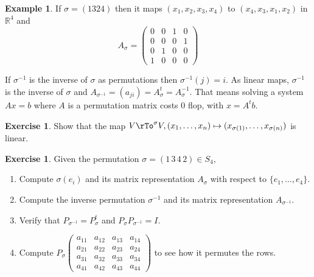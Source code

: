 \documentclass[12pt]{amsart}
\theoremstyle{definition}
\newtheorem{example}[theorem]{Example}
\newtheorem{exercise}[theorem]{Exercise}
\begin{document}
\begin{example} If $\sigma = (1 3 2 4)$ then it maps $(x_1, x_2, x_3, x_4)$ to $(x_4, x_3, x_1, x_2)$ in $\mathbb{R}^4$ and
$$A_{\sigma} = \left(\begin{array}{cccc} 0 & 0 & 1 & 0 \\ 0 & 0 & 0 & 1 \\ 0 & 1 & 0 & 0 \\ 1 & 0 & 0 & 0 \end{array}\right)$$
\end{example}

If $\sigma^{-1}$ is the inverse of $\sigma$ as permutations then $\sigma^{-1}(j) = i$. As linear maps, $\sigma^{-1}$ is the inverse of $\sigma$ and $A_{\sigma^{-1}} = (a_{ji}) = A_{\sigma}^t = A_{\sigma}^{-1}$. That means solving a system $Ax = b$ where $A$ is a permutation matrix costs 0 flop, with $x = A^t b$.

\begin{exercise}\label{} Show that the map $V \rTo^{\sigma} V, (x_1, \dots, x_n) \mapsto (x_{\sigma(1)}, \dots , x_{\sigma(n)})$ is linear.
\end{exercise}

\begin{exercise}\label{} Given the permutation $\sigma = (1 \, 3 \, 4 \, 2) \in S_4$,
\begin{enumerate}[\indent a.]
\item Compute $\sigma(e_i)$ and its matrix representation $A_{\sigma}$ with respect to $\{e_1, \dots , e_4\}$.
\item Compute the inverse permutation $\sigma^{-1}$ and its matrix representation $A_{\sigma^{-1}}$.
\item Verify that $P_{\sigma^{-1}} = P_{\sigma}^t$ and $P_{\sigma} P_{\sigma^{-1}} = I$.
\item Compute $P_{\sigma} \left(\begin{array}{cccc} a_{11} & a_{12} & a_{13} & a_{14} \\ a_{21} & a_{22} & a_{23} & a_{24} \\ a_{31} & a_{32} & a_{33} & a_{34} \\ a_{41} & a_{42} & a_{43} & a_{44} \end{array} \right)$ to see how it permutes the rows.
\end{enumerate}
\end{exercise}
\end{document}

